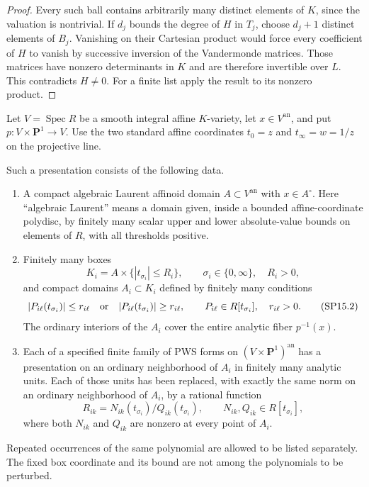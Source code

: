 \begin{proof}
Every such ball contains arbitrarily many distinct elements of
$K$, since the valuation is nontrivial. If $d_j$ bounds the degree
of $H$ in $T_j$, choose $d_j+1$ distinct elements of $B_j$.
Vanishing on their Cartesian product would force every coefficient
of $H$ to vanish by successive inversion of the Vandermonde matrices.
Those matrices have nonzero determinants in $K$ and are therefore
invertible over $L$. This contradicts $H\ne0$. For a finite list
apply the result to its nonzero product.
\end{proof}

Let $V=\operatorname{Spec}R$ be a smooth integral affine
$K$-variety, let $x\in V^{\mathrm{an}}$, and put
$p:V\times\mathbf P^1\to V$.
Use the two standard affine coordinates $t_0=z$ and
$t_\infty=w=1/z$ on the projective line.

\begin{definition}
\label{r15b:Laurent-fiber-presentation}
Such a presentation consists of the following data.
\begin{enumerate}
\item A compact algebraic Laurent affinoid domain
$A\subset V^{\mathrm{an}}$ with $x\in A^\circ$.
Here ``algebraic Laurent'' means a domain given, inside a bounded
affine-coordinate polydisc, by finitely many scalar upper and lower
absolute-value bounds on elements of $R$, with all thresholds
positive.
\item Finitely many boxes
\[
 K_i=A\times\{|t_{\sigma_i}|\leq R_i\},\qquad
        \sigma_i\in\{0,\infty\},\quad R_i>0,
\]
and compact domains $A_i\subset K_i$ defined by finitely many
conditions
\[
      |P_{i\ell}(t_{\sigma_i})|\leq r_{i\ell}
      \quad\hbox{or}\quad
      |P_{i\ell}(t_{\sigma_i})|\geq r_{i\ell},
 \qquad P_{i\ell}\in R[t_{\sigma_i}],\quad r_{i\ell}>0.
\tag{SP15.2}\label{r15b:Laurent-inequalities}
\]
The ordinary interiors of the $A_i$ cover the entire analytic
fiber $p^{-1}(x)$.
\item Each of a specified finite family of PWS forms on
$(V\times\mathbf P^1)^{\mathrm{an}}$ has a presentation on an
ordinary neighborhood of $A_i$ in finitely many analytic units.
Each of those units has been replaced, with exactly the same norm
on an ordinary neighborhood of $A_i$, by a rational function
\[
          R_{ik}=N_{ik}(t_{\sigma_i})/Q_{ik}(t_{\sigma_i}),
       \qquad N_{ik},Q_{ik}\in R[t_{\sigma_i}],
\tag{SP15.3}\label{r15b:rational-unit}
\]
where both $N_{ik}$ and $Q_{ik}$ are nonzero at every point of
$A_i$.
\end{enumerate}
Repeated occurrences of the same polynomial are allowed to be
listed separately. The fixed box coordinate and its bound are
not among the polynomials to be perturbed.
\end{definition}

